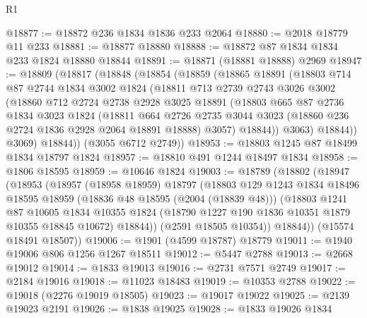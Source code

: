 \begin{lexlean}{R1}
\begin{coremodule}
@18877 := @18872 @236 @1834 @1836 @233 @2064
@18880 := @2018 @18779 @11 @233
@18881 := @18877 @18880
@18888 := @18872 @87 @1834 @1834 @233 @1824 @18880 @18844
@18891 := @18871 (@18881 @18888) @2969
@18947 := @18809
    (@18817
      (@18848
        (@18854
          (@18859
            (@18865
              @18891
              (@18803
                @714
                @87
                @2744
                @1834
                @3002
                @1824
                (@18811
                  @713
                  @2739
                  @2743
                  @3026
                  @3002
                  (@18860
                    @712
                    @2724
                    @2738
                    @2928
                    @3025
                    @18891
                    (@18803
                      @665
                      @87
                      @2736
                      @1834
                      @3023
                      @1824
                      (@18811
                        @664
                        @2726
                        @2735
                        @3044
                        @3023
                        (@18860 @236 @2724 @1836 @2928 @2064 @18891 @18888)
                        @3057)
                      @18844))
                  @3063)
                @18844))
            @3069)
          @18844))
      (@3055 @6712 @2749))
@18953 := @18803 @1245 @87 @18499 @1834 @18797 @1824
@18957 := @18810 @491 @1244 @18497 @1834
@18958 := @1806 @18595
@18959 := @10646 @1824
@19003 := @18789
    (@18802
      (@18947
        (@18953
          (@18957
            (@18958 @18959)
            @18797
            (@18803
              @129
              @1243
              @1834
              @18496
              @18595
              @18959
              (@18836 @48 @18595 (@2004 (@18839 @48)))
              (@18803
                @1241
                @87
                @10605
                @1834
                @10355
                @1824
                (@18790 @1227 @190 @1836 @10351 @1879 @10355 @18845 @10672)
                @18844))
            (@2591 @18505 @10354))
          @18844))
      (@15574 @18491 @18507))
@19006 := @1901 (@4599 @18787) @18779
@19011 := @1940 @19006 @806 @1256 @1267 @18511
@19012 := @5447 @2788
@19013 := @2668 @19012
@19014 := @1833 @19013
@19016 := @2731 @7571 @2749
@19017 := @2184 @19016
@19018 := @11023 @18483
@19019 := @10353 @2788
@19022 := @19018 (@2276 @19019 @18505)
@19023 := @19017 @19022
@19025 := @2139 @19023 @2191
@19026 := @1838 @19025
@19028 := @1833 @19026 @1834

\end{coremodule}
\end{lexlean}
